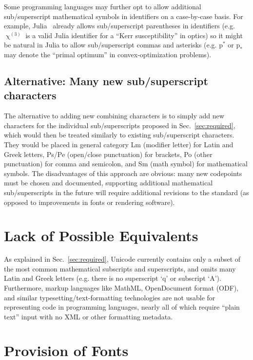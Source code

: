 \documentclass[10pt,english]{article}
\newcommand{\secref}[1]{Sec.~\ref{sec:#1}}
\begin{document}
Some programming languages may further opt to allow additional sub/superscript mathematical symbols in identifiers on a case-by-case basis. For example, Julia~\cite{Julia} already allows sub/superscript parentheses in identifiers (e.g. $\upchi^{(3)}$ is a valid Julia identifier for a ``Kerr susceptibility'' in optics) so it might be natural in Julia to allow sub/superscript commas and asterisks (e.g. $\mathrm{p}^*$ or $\mathrm{p}_*$ may denote the ``primal optimum'' in convex-optimization problems). 

\subsection{Alternative: Many new sub/superscript characters}

The alternative to adding new combining characters is to simply add new characters for the individual sub/superscripts proposed in \secref{required}, which would then be treated similarly to existing sub/superscript characters.  They would be placed in general category Lm (modifier letter) for Latin and Greek letters, Ps/Pe (open/close punctuation) for brackets, Po (other punctuation) for comma and semicolon, and Sm (math symbol) for mathematical symbols.   The disadvantages of this approach are obvious: many new codepoints must be chosen and documented, supporting additional mathematical sub/superscripts in the future will require additional revisions to the standard (as opposed to improvements in fonts or rendering software).

\section{Lack of Possible Equivalents}

As explained in \secref{required}, Unicode currently contains only a subset of the most common mathematical subscripts and superscripts, and omits many Latin and Greek letters (e.g. there is no superscript `q' or subscript `A').  Furthermore, markup languages like MathML, OpenDocument format (ODF), and similar typesetting/text-formatting technologies are not usable for representing code in programming languages, nearly all of which require ``plain text'' input with no XML or other formatting metadata.

\section{Provision of Fonts}
\end{document}
